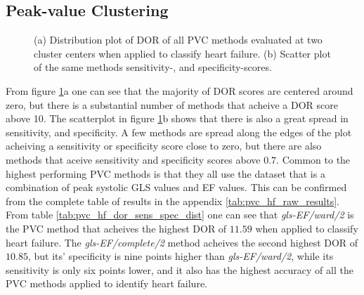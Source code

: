 \newpage

\subsection{Peak-value Clustering}

\begin{figure}[htb]
    \centering
    
    \caption{(a) Distribution plot of DOR of all PVC methods evaluated at two cluster centers when applied to classify heart failure.
             (b) Scatter plot of the same methods sensitivity-, and specificity-scores.}
    \label{fig:pvc_hf_dor_sens_spec_dist}
\end{figure}

From figure \ref{fig:pvc_hf_dor_sens_spec_dist}a one can see that the majority of DOR scores are centered around zero, 
but there is a substantial number of methods that acheive a DOR score above 10.
The scatterplot in figure \ref{fig:pvc_hf_dor_sens_spec_dist}b shows that there is also a great spread in sensitivity, and specificity. 
A few methods are spread along the edges of the plot acheiving a sensitivity or specificity score close to zero, 
but there are also methods that aceive sensitivity and specificity scores above $0.7$.
Common to the highest performing PVC methods is that they all use the dataset that is a combination of peak systolic GLS values and EF values.
This can be confirmed from the complete table of results in the appendix \ref{tab:pvc_hf_raw_results}.
From table \ref{tab:pvc_hf_dor_sens_spec_dist} one can see that \textit{gls-EF/ward/2} is the PVC method that acheives the highest DOR of $11.59$ when applied to classify heart failure.
The \textit{gls-EF/complete/2} method acheives the second highest DOR of $10.85$, but its' specificity is nine points higher than \textit{gls-EF/ward/2}, while its sensitivity is only
six points lower, and it also has the highest accuracy of all the PVC methods applied to identify heart failure.
\bigskip

